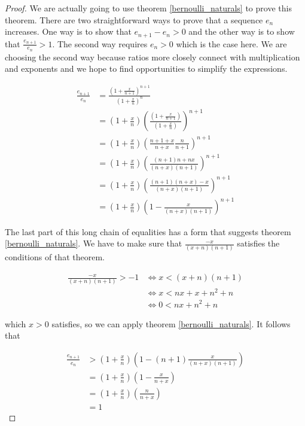 \begin{proof}

We are actually going to use theorem \ref{bernoulli_naturals} to prove this theorem. There are two straightforward ways to prove that a sequence $e_n$ increases. One way is to show that $e_{n+1} - e_n > 0$ and the other way is to show that $\frac{e_{n+1}}{e_n} > 1$. The second way requires $e_n > 0$ which is the case here. We are choosing the second way because ratios more closely connect with multiplication and exponents and we hope to find opportunities to simplify the expressions.

\begin{align*}
\frac{e_{n+1}}{e_n} &= \frac{(1 + \frac{x}{n+1})^{n+1}}{(1 + \frac{x}{n})^n} \\
                    &= (1 + \frac{x}{n}) (\frac{(1 + \frac{x}{n+1})}{(1 + \frac{x}{n})})^{n+1} \\
                    &= (1 + \frac{x}{n}) (\frac{n + 1 + x}{n+x} \frac{n}{n+1})^{n+1} \\
                    &= (1 + \frac{x}{n}) (\frac{(n + 1) n + n x}{(n+x) (n + 1)})^{n+1} \\
                    &= (1 + \frac{x}{n}) (\frac{(n + 1) (n + x) - x}{(n+x) (n + 1)})^{n+1} \\
                    &= (1 + \frac{x}{n}) ( 1 - \frac{x}{(n+x) (n + 1)})^{n+1}
\end{align*}

The last part of this long chain of equalities has a form that suggests theorem \ref{bernoulli_naturals}. We have to make sure that $\frac{-x}{(x + n)(n + 1)}$ satisfies the conditions of that theorem. 

\begin{align*}
\frac{-x}{(x + n)(n+1)} > - 1 &\Leftrightarrow x < (x + n)(n+1) \\
                              &\Leftrightarrow x < n x + x + n^2 + n \\
                              &\Leftrightarrow 0 < n x + n^2 + n
\end{align*}

which $x > 0$ satisfies, so we can apply theorem \ref{bernoulli_naturals}. It follows that

\begin{align*}
\frac{e_{n+1}}{e_n} &> (1 + \frac{x}{n}) (1 - (n+1) \frac{x}{(n+x) (n + 1)}) \\
                    &= (1 + \frac{x}{n}) (1 - \frac{x}{n+x}) \\
                    &= (1 + \frac{x}{n}) (\frac{n}{n+x}) \\
                    &= 1
\end{align*}

\end{proof}

